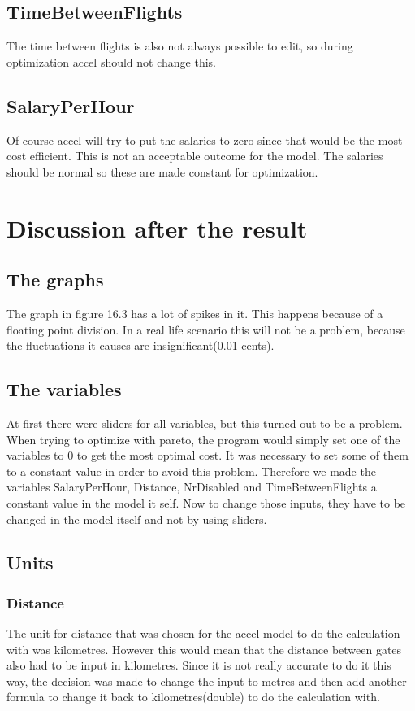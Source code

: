\documentclass[a4paper, 11pt, notitlepage]{report}
\begin{document}
	\section{TimeBetweenFlights}
The time between flights is also not always possible to edit, so during optimization accel should not change this.
	
	\section{SalaryPerHour}
Of course accel will try to put the salaries to zero since that would be the most cost efficient. This is not an acceptable outcome for the model. The salaries should be normal so these are made constant for optimization.

\chapter{Discussion after the result}

	\section{The graphs}
	The graph in figure 16.3 has a lot of spikes in it. This happens because of a floating point division. In a real life scenario this will not be a problem, because the fluctuations it causes are insignificant(0.01 cents).
	
	\section{The variables}
	At first there were sliders for all variables, but this turned out to be a problem. When trying to optimize with pareto, the program would simply set one of the variables to 0 to get the most optimal cost. It was necessary to set some of them to a constant value in order to avoid this problem. Therefore we made the variables SalaryPerHour, Distance, NrDisabled and TimeBetweenFlights a constant value in the model it self. Now to change those inputs, they have to be changed in the model itself and not by using sliders.
	
	\section{Units}
		\subsection{Distance}
		The unit for distance that was chosen for the accel model to do the calculation with was kilometres. However this would mean that the distance between gates also had to be input in kilometres. Since it is not really accurate to do it this way, the decision was made to change the input to metres and then add another formula to change it back to kilometres(double) to do the calculation with.
\end{document}
